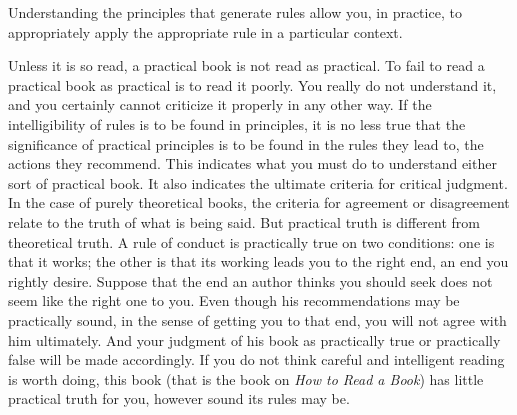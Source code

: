 Understanding the principles that generate rules allow you, in practice, to appropriately apply the appropriate rule in a particular context. 
\begin{displayquote}
Unless it is so read, a practical book is not read as practical. To fail to read a practical book as practical is to read it poorly. You really do not understand it, and you certainly cannot criticize it properly in any other way. If the intelligibility of rules is to be found in principles, it is no less true that the significance of practical principles is to be found in the rules they lead to, the actions they recommend. This indicates what you must do to understand either sort of practical book. It also indicates the ultimate criteria for critical judgment. In the case of purely theoretical books, the criteria for agreement or disagreement relate to the truth of what is being said. But practical truth is different from theoretical truth. A rule of conduct is practically true on two conditions: one is that it works; the other is that its working leads you to the right end, an end you rightly desire. Suppose that the end an author thinks you should seek does not seem like the right one to you. Even though his recommendations may be practically sound, in the sense of getting you to that end, you will not agree with him ultimately. And your judgment of his book as practically true or practically false will be made accordingly. If you do not think careful and intelligent reading is worth doing, this book (that is the book on \textit{How to Read a Book}) has little practical truth for you, however sound its rules may be.
\end{displayquote}


\printbibliography[heading=subbibintoc]



